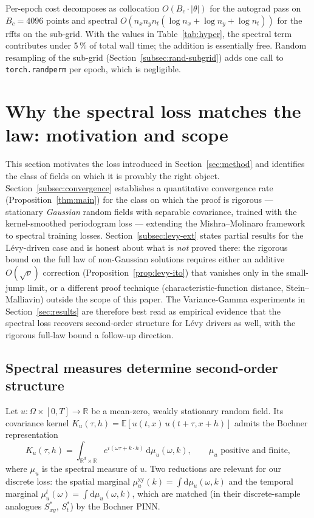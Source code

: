 \documentclass[review,12pt]{elsarticle}
\begin{document}
Per-epoch cost decomposes as collocation \(O(B_c \cdot |\theta|)\)
for the autograd pass on \(B_c = 4096\) points and spectral
\(O(n_x n_y n_t (\log n_x + \log n_y + \log n_t))\) for the rffts
on the sub-grid. With the values in Table~\ref{tab:hyper}, the
spectral term contributes under 5\,\% of total wall time; the
addition is essentially free. Random resampling of the sub-grid
(Section~\ref{subsec:rand-subgrid}) adds one call to
\texttt{torch.randperm} per epoch, which is negligible.

\section{Why the spectral loss matches the law: motivation and scope}
\label{sec:theory}

This section motivates the loss introduced in Section~\ref{sec:method}
and identifies the class of fields on which it is provably the right
object. Section~\ref{subsec:convergence} establishes a quantitative
convergence rate (Proposition~\ref{thm:main}) for the class on which the
proof is rigorous --- stationary \emph{Gaussian} random fields with
separable covariance, trained with the kernel-smoothed periodogram
loss --- extending the Mishra--Molinaro
framework~\cite{MishraMolinaro2022,DeRyckMishra2022} to spectral
training losses. Section~\ref{subsec:levy-ext} states partial
results for the L\'evy-driven case and is honest about what is
\emph{not} proved there: the rigorous bound on the full law of
non-Gaussian solutions requires either an additive $O(\sqrt{\nu})$
correction (Proposition~\ref{prop:levy-ito}) that vanishes only in the
small-jump limit, or a different proof technique
(characteristic-function distance, Stein--Malliavin) outside the
scope of this paper. The Variance-Gamma experiments in
Section~\ref{sec:results} are therefore best read as empirical
evidence that the spectral loss recovers second-order structure for
L\'evy drivers as well, with the rigorous full-law bound a
follow-up direction.

\subsection{Spectral measures determine second-order structure}

Let \(u : \Omega \times [0, T] \to \mathbb R\) be a mean-zero,
weakly stationary random field. Its covariance kernel
\(K_u(\tau, h) = \mathbb E[u(t,x)\,u(t+\tau, x+h)]\) admits the
Bochner representation~\cite[Thm.~9.18]{RudinRCA}
\begin{equation}
K_u(\tau, h) = \int_{\mathbb R^d \times \mathbb R}
e^{i(\omega \tau + k \cdot h)}\,\mathrm d\mu_u(\omega, k),
\qquad \mu_u\text{ positive and finite},
\label{eq:bochner}
\end{equation}
where \(\mu_u\) is the spectral measure of \(u\). Two reductions
are relevant for our discrete loss: the spatial marginal
\(\mu^{\mathrm{xy}}_u(k) = \int \mathrm d \mu_u(\omega, k)\) and
the temporal marginal
\(\mu^t_u(\omega) = \int \mathrm d \mu_u(\omega, k)\), which are
matched (in their discrete-sample analogues \(S^*_{xy}\),
\(S^*_t\)) by the Bochner PINN.
\end{document}
